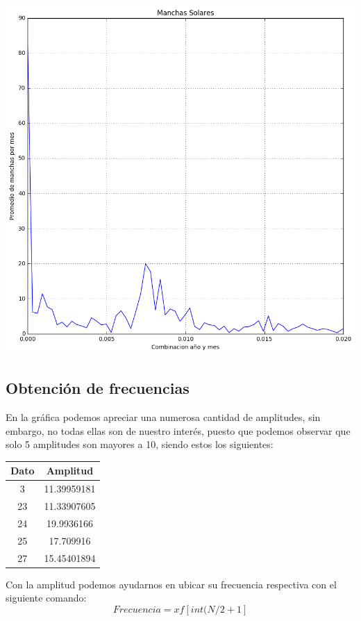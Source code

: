 \documentclass[a4paper,12pt]{article}
\begin{document}
\begin{center}
\includegraphics[scale=0.5]{Fouriermanchas.png}
\end{center}

\subsection{Obtención de frecuencias}
\noindent
En la gráfica podemos apreciar una numerosa cantidad de amplitudes, sin embargo, no todas ellas son de nuestro interés, puesto que podemos observar que solo 5 amplitudes son mayores a 10, siendo estos los siguientes:

\begin{center}
\begin{tabular}{|c|c|}
\hline
Dato  & Amplitud \\ \hline
3  &11.39959181\\ \hline
23  &11.33907605\\ \hline
24  &19.9936166\\ \hline
25  &17.709916\\ \hline
27 &15.45401894\\ \hline
\end{tabular}
\end{center}

\noindent
Con la amplitud podemos ayudarnos en ubicar su frecuencia respectiva con el siguiente comando:
\begin{equation*}
Frecuencia =  xf[int(N/2 +1]
\end{equation*}
\end{document}

